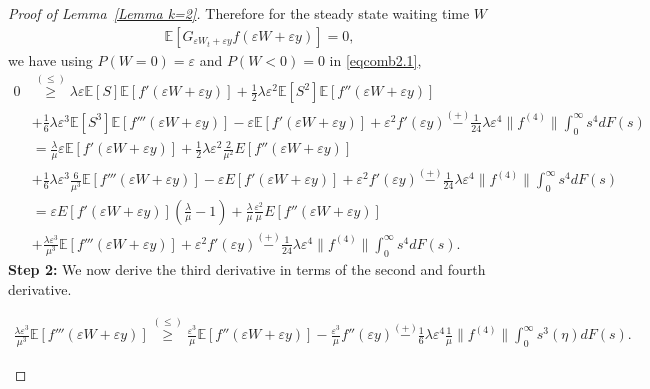 \documentclass[10pt,a4paper]{amsart}
\begin{document}
\begin{proof}[Proof of Lemma~\ref{Lemma k=2}]
Therefore for the steady state waiting time $W$ 
\begin{align*}
    \mathbb E[G_{\varepsilon W_t+\varepsilon y}f(\varepsilon W+\varepsilon y) ]=0,
\end{align*}
we have using $P(W=0)=\varepsilon$ and  $P(W<0)=0$ in \eqref{eqcomb2.1},
\begin{align}\label{stg23}
    0 &\stackrel{(\leq)} {\geq} \lambda \varepsilon \mathbb E[S]\mathbb E[f'(\varepsilon W+\varepsilon y)]+\frac{1}{2}\lambda \varepsilon^2 \mathbb E[S^2]\mathbb E[f''(\varepsilon W+\varepsilon y)] \nonumber\\
    &+\frac{1}{6}\lambda \varepsilon^3 \mathbb E[S^3]\mathbb E[f'''(\varepsilon W+\varepsilon y)]-\varepsilon \mathbb E[f'(\varepsilon W+\varepsilon y)]+\varepsilon^2 f'(\varepsilon y)\stackrel{(+)}{-}\frac{1}{24}\lambda \varepsilon^4 \|f^{(4)}\| \int_0^\infty s^4 dF(s) \nonumber\\
    &=\frac{\lambda}{\mu}\varepsilon \mathbb E[f'(\varepsilon W+\varepsilon y)]+\frac{1}{2}\lambda \varepsilon^2 \frac{2}{\mu^2}E[f''(\varepsilon W+\varepsilon y)] \nonumber\\
    &+\frac{1}{6}\lambda \varepsilon^3 \frac{6}{\mu^3}\mathbb E[f'''(\varepsilon W+\varepsilon y)]-\varepsilon E[f'(\varepsilon W+\varepsilon y)]+\varepsilon^2f'(\varepsilon y)\stackrel{(+)}{-}\frac{1}{24}\lambda \varepsilon^4 \|f^{(4)}\| \int_0^\infty s^4 dF(s) \nonumber\\
    &=\varepsilon E[f'(\varepsilon W+\varepsilon y)]\left(\frac{\lambda}{\mu}-1\right)+\frac{\lambda}{\mu}\frac{\varepsilon^2}{\mu}E[f''(\varepsilon W+\varepsilon y)] \nonumber\\
    &+\frac{\lambda \varepsilon^3}{\mu^3}\mathbb E[f'''(\varepsilon W+\varepsilon y)]+\varepsilon^2f'(\varepsilon y)\stackrel{(+)}{-}\frac{1}{24}\lambda \varepsilon^4 \|f^{(4)}\| \int_0^\infty s^4dF(s).
 \end{align}
\textbf{Step 2:} We now derive the third derivative in terms of the second and fourth derivative. %
\begin{claim}
    \begin{align*}
        \frac{\lambda \varepsilon^3}{\mu^3}\mathbb E[f'''(\varepsilon W+\varepsilon y)] \stackrel{(\leq)} {\geq} \frac{\varepsilon^3}{\mu}\mathbb E[f''(\varepsilon W+\varepsilon y)]-\frac{\varepsilon^3}{\mu}f''(\varepsilon y)\stackrel{(+)}{-}\frac{1}{6} \lambda \varepsilon^4 \frac{1}{\mu} \|f^{(4)}\|\int_0^\infty s^3(\eta )dF(s).
    \end{align*}
\end{claim}

\end{proof}
\end{document}
